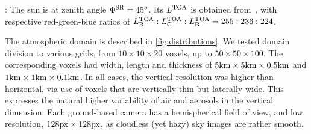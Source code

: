 \documentclass[10pt,letterpaper]{article}
\begin{document}
: The sun is at zenith angle $\Phi^{\rm
  SR}=45^o$.  Its $L^{\rm TOA}$ is obtained
from~\cite{BBradiance,sun_composition}, with respective red-green-blue
ratios of $L^{\rm TOA}_{\rm R}:L^{\rm TOA}_{\rm G}:L^{\rm TOA}_{\rm
  B}=255:236:224$.

The atmospheric domain is described in \cref{fig:distributions}.
We tested domain division to various grids, from $10\times10 \times
20$ voxels, up to $50\times50 \times 100$. The corresponding voxels
had width, length and thickness of $5{\rm km}\times 5{\rm km} \times
0.5{\rm km}$ and $1{\rm km}\times 1{\rm km} \times 0.1{\rm km}$.
In all cases, the vertical resolution was higher than horizontal, via use
of voxels that are vertically thin but laterally wide. This expresses the natural 
higher variability of air and aerosols in the vertical dimension. Each
ground-based camera has a hemispherical field of view, and low
resolution, $128 \rm{px} \times 128 \rm{px}$, as cloudless (yet hazy)
sky images are rather smooth.
\\
\end{document}
